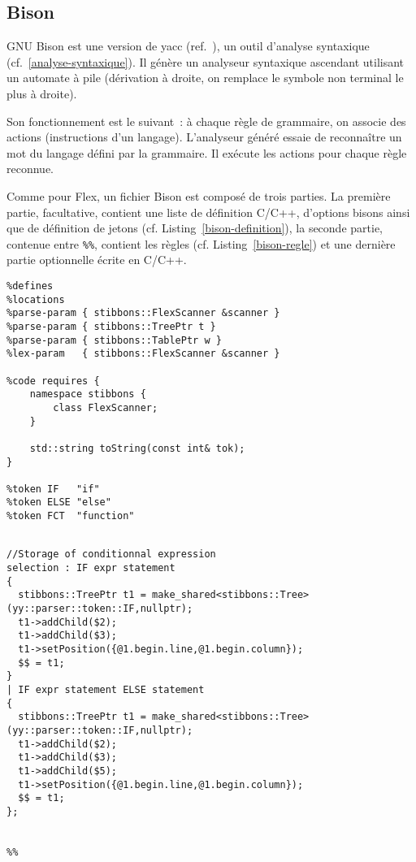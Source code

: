 \subsection{Bison}

GNU Bison est une version de yacc (ref.~\cite{bison}), un outil d'analyse syntaxique (cf.~\ref{analyse-syntaxique}). Il génère un analyseur syntaxique ascendant utilisant un automate à pile (dérivation à droite, on remplace le symbole non terminal le plus à droite).

Son fonctionnement est le suivant~: à chaque règle de grammaire, on associe des actions (instructions d'un langage). L'analyseur généré essaie de reconnaître un mot du langage défini par la grammaire. Il exécute les actions pour chaque règle reconnue.

Comme pour Flex, un fichier Bison est composé de trois parties. La première partie, facultative, contient une liste de définition C/C++, d'options bisons ainsi que de définition de jetons (cf. Listing~\ref{bison-definition}), la seconde partie, contenue entre \verb|%%|, contient les règles (cf. Listing~\ref{bison-regle}) et une dernière partie optionnelle écrite en C/C++.

\begin{lstlisting}[label=bison-definition,caption=Definition C++ en bison]
%skeleton "lalr1.cc"
%defines
%locations
%parse-param { stibbons::FlexScanner &scanner }
%parse-param { stibbons::TreePtr t }
%parse-param { stibbons::TablePtr w }
%lex-param   { stibbons::FlexScanner &scanner }

%code requires {
	namespace stibbons {
		class FlexScanner;
	}

	std::string toString(const int& tok);
}

%token IF   "if"
%token ELSE "else"
%token FCT  "function"
\end{lstlisting}

\begin{lstlisting}[label=bison-regle,caption=Règles de grammaire en bison]
%%

//Storage of conditionnal expression
selection : IF expr statement
{
  stibbons::TreePtr t1 = make_shared<stibbons::Tree>(yy::parser::token::IF,nullptr);
  t1->addChild($2);
  t1->addChild($3);
  t1->setPosition({@1.begin.line,@1.begin.column});
  $$ = t1;
}
| IF expr statement ELSE statement
{
  stibbons::TreePtr t1 = make_shared<stibbons::Tree>(yy::parser::token::IF,nullptr);
  t1->addChild($2);
  t1->addChild($3);
  t1->addChild($5);
  t1->setPosition({@1.begin.line,@1.begin.column});
  $$ = t1;
};


%%
\end{lstlisting}

